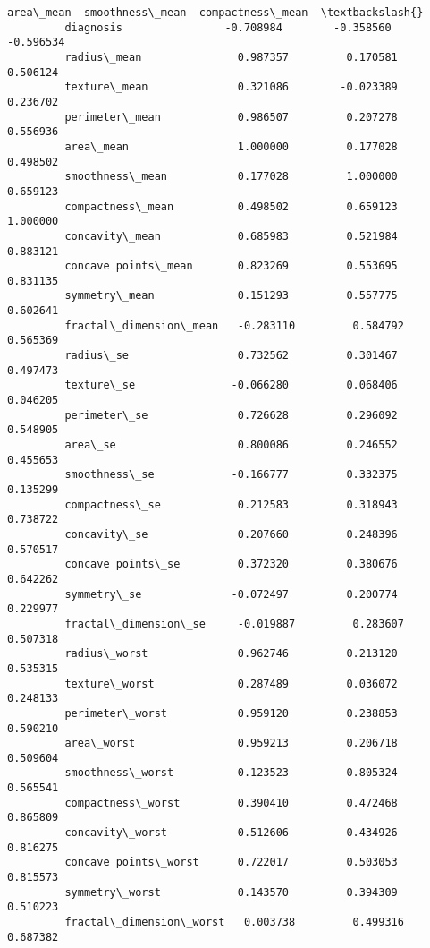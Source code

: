 \documentclass[11pt]{article}
\begin{document}
\begin{Verbatim}[commandchars=\\\{\}]
                                  area\_mean  smoothness\_mean  compactness\_mean  \textbackslash{}
         diagnosis                -0.708984        -0.358560         -0.596534   
         radius\_mean               0.987357         0.170581          0.506124   
         texture\_mean              0.321086        -0.023389          0.236702   
         perimeter\_mean            0.986507         0.207278          0.556936   
         area\_mean                 1.000000         0.177028          0.498502   
         smoothness\_mean           0.177028         1.000000          0.659123   
         compactness\_mean          0.498502         0.659123          1.000000   
         concavity\_mean            0.685983         0.521984          0.883121   
         concave points\_mean       0.823269         0.553695          0.831135   
         symmetry\_mean             0.151293         0.557775          0.602641   
         fractal\_dimension\_mean   -0.283110         0.584792          0.565369   
         radius\_se                 0.732562         0.301467          0.497473   
         texture\_se               -0.066280         0.068406          0.046205   
         perimeter\_se              0.726628         0.296092          0.548905   
         area\_se                   0.800086         0.246552          0.455653   
         smoothness\_se            -0.166777         0.332375          0.135299   
         compactness\_se            0.212583         0.318943          0.738722   
         concavity\_se              0.207660         0.248396          0.570517   
         concave points\_se         0.372320         0.380676          0.642262   
         symmetry\_se              -0.072497         0.200774          0.229977   
         fractal\_dimension\_se     -0.019887         0.283607          0.507318   
         radius\_worst              0.962746         0.213120          0.535315   
         texture\_worst             0.287489         0.036072          0.248133   
         perimeter\_worst           0.959120         0.238853          0.590210   
         area\_worst                0.959213         0.206718          0.509604   
         smoothness\_worst          0.123523         0.805324          0.565541   
         compactness\_worst         0.390410         0.472468          0.865809   
         concavity\_worst           0.512606         0.434926          0.816275   
         concave points\_worst      0.722017         0.503053          0.815573   
         symmetry\_worst            0.143570         0.394309          0.510223   
         fractal\_dimension\_worst   0.003738         0.499316          0.687382   
         

\end{Verbatim}
\end{document}
